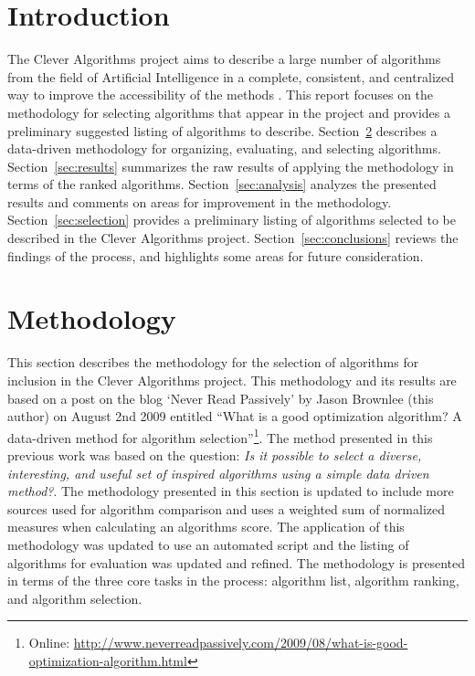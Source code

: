 \documentclass[a4paper, 11pt]{article}
\begin{document}
\section{Introduction}
\label{sec:introduction}
The Clever Algorithms project aims to describe a large number of algorithms from the field of Artificial Intelligence in a complete, consistent, and centralized way to improve the accessibility of the methods \cite{Brownlee2010}. 
This report focuses on the methodology for selecting algorithms that appear in the project and provides a preliminary suggested listing of algorithms to describe. 
Section~\ref{sec:methodology} describes a data-driven methodology for organizing, evaluating, and selecting algorithms. Section~\ref{sec:results} summarizes the raw results of applying the methodology in terms of the ranked algorithms. Section~\ref{sec:analysis} analyzes the presented results and comments on areas for improvement in the methodology. Section~\ref{sec:selection} provides a preliminary listing of algorithms selected to be described in the Clever Algorithms project. Section~\ref{sec:conclusions} reviews the findings of the process, and highlights some areas for future consideration.

% 
% 
\section{Methodology}
\label{sec:methodology}
This section describes the methodology for the selection of algorithms for inclusion in the Clever Algorithms project. This methodology and its results are based on a post on the blog `Never Read Passively' by Jason Brownlee (this author) on August 2nd 2009 entitled ``What is a good optimization algorithm? A data-driven method for algorithm selection''\footnote{Online: \url{http://www.neverreadpassively.com/2009/08/what-is-good-optimization-algorithm.html}}. The method presented in this previous work was based on the question: \emph{Is it possible to select a diverse, interesting, and useful set of inspired algorithms using a simple data driven method?}. The methodology presented in this section is updated to include more sources used for algorithm comparison and uses a weighted sum of normalized measures when calculating an algorithms score. The application of this methodology was updated to use an automated script and the listing of algorithms for evaluation was updated and refined. The methodology is presented in terms of the three core tasks in the process: algorithm list, algorithm ranking, and algorithm selection.
\end{document}
